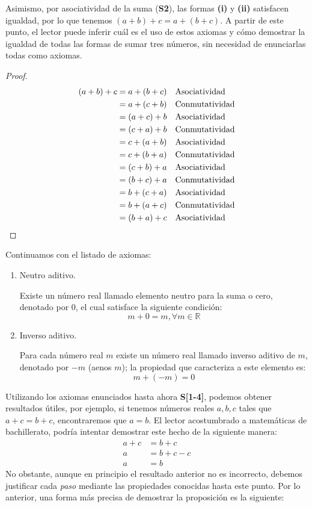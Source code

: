 \documentclass[11pt]{article}
\newcommand{\R}{\mathbb{R}}
\begin{document}
Asimismo, por asociatividad de la suma (\textbf{S2}), las formas \textbf{(i)} y \textbf{(ii)} satisfacen igualdad, por lo que tenemos $(a+b)+c=a+(b+c)$. A partir de este punto, el lector puede inferir cuál es el uso de estos axiomas y cómo demostrar la igualdad de todas las formas de sumar tres números, sin necesidad de enunciarlas todas como axiomas.
\vspace{-2em}\begin{proof} \begin{align*}
    (a+b)+c &= a+(b+c) && \text{Asociatividad}\\
    &= a+(c+b) && \text{Conmutatividad}\\
    &= (a+c)+b && \text{Asociatividad}\\
    &= (c+a)+b && \text{Conmutatividad}\\
    &= c+(a+b) && \text{Asociatividad}\\
    &= c+(b+a) && \text{Conmutatividad}\\
    &= (c+b)+a && \text{Asociatividad}\\
    &= (b+c)+a && \text{Conmutatividad}\\
    &= b+(c+a) && \text{Asociatividad}\\
    &= b+(a+c) && \text{Conmutatividad}\\
    &= (b+a)+c && \text{Asociatividad} \qedhere
\end{align*} \end{proof} \vspace{-1em}

Continuamos con el listado de axiomas:

\begin{enumerate}[start=3,label=S\arabic*.]
    \item Neutro aditivo.
    
    Existe un número real llamado elemento neutro para la suma o cero, denotado por $0$, el cual satisface la siguiente condición: \[ m+0=m,\forall m \in \R
    \]
    \item Inverso aditivo.
    
    Para cada número real $m$ existe un número real llamado inverso aditivo de $m$, denotado por $-m$ (aenos $m$); la propiedad que caracteriza a este elemento es: \[m + (-m) = 0
    \]
\end{enumerate}

Utilizando los axiomas enunciados hasta ahora \textbf{S[1-4]}, podemos obtener resultados útiles, por ejemplo, si tenemos números reales $a,b,c$ tales que $a+c=b+c$, encontraremos que $a=b$. El lector acostumbrado a matemáticas de bachillerato, podría intentar demostrar este hecho de la siguiente manera: \begin{align*}
    a+c &= b+c\\
    a &= b+c-c\\
    a &= b
\end{align*}
No obstante, aunque en principio el resultado anterior no es incorrecto, debemos justificar cada \textit{paso} mediante las propiedades conocidas hasta este punto. Por lo anterior, una forma más precisa de demostrar la proposición es la siguiente:
\end{document}
